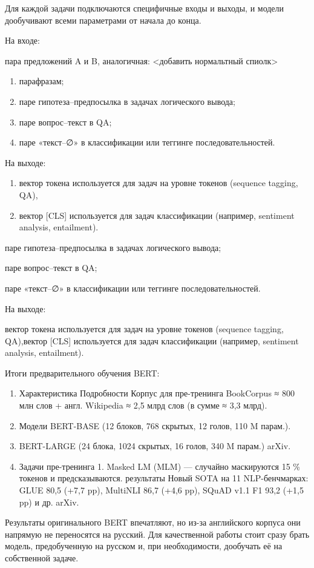 Для каждой задачи  подключаются специфичные входы и выходы, и модели дообучивают всеми параметрами  от начала до конца.

На входе:

пара предложений A и B, аналогичная: <добавить нормальтный спиолк>
\begin{enumerate}[label=\arabic*.]
\item парафразам;
\item паре гипотеза–предпосылка в задачах логического вывода;
\item паре вопрос–текст в QA;
\item паре «текст–∅» в классификации или теггинге последовательностей.
\end{enumerate}

На выходе:
\begin{enumerate}[label=\arabic*.]
\item вектор токена используется для задач на уровне токенов (sequence tagging, QA),
\item вектор [CLS] используется для задач классификации (например, sentiment analysis, entailment).
\end{enumerate}
паре гипотеза–предпосылка в задачах логического вывода;

паре вопрос–текст в QA;

паре «текст–∅» в классификации или теггинге последовательностей.

На выходе:

вектор токена используется для задач на уровне токенов (sequence tagging, QA),вектор [CLS] используется для задач классификации (например, sentiment analysis, entailment).

Итоги предварительного обучения BERT:

\begin{enumerate}[label=\arabic*.]
\item Характеристика	Подробности
Корпус для пре-тренинга	BookCorpus ≈ 800 млн слов + англ. Wikipedia ≈ 2,5 млрд слов (в сумме ≈ 3,3 млрд).
\item Модели	BERT-BASE (12 блоков, 768 скрытых, 12 голов, 110 M парам.).
\item BERT-LARGE (24 блока, 1024 скрытых, 16 голов, 340 M парам.) 
arXiv.
\item Задачи пре-тренинга	1. Masked LM (MLM) — случайно маскируются 15 \% токенов и предсказываются.
 результаты	Новый SOTA на 11 NLP-бенчмарках: GLUE 80,5 (+7,7 pp), MultiNLI 86,7 (+4,6 pp), SQuAD v1.1 F1 93,2 (+1,5 pp) и др. 
arXiv.
\end{enumerate}

Результаты оригинального BERT впечатляют, но из-за английского корпуса они напрямую не переносятся на русский. Для качественной работы стоит сразу брать модель, предобученную на русском и, при необходимости, дообучать её на собственной задаче.

